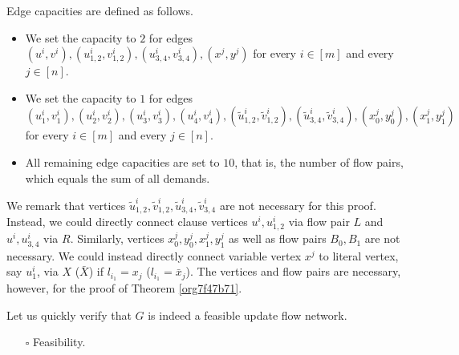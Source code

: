 \documentclass[fontsize=11pt,paper=a4]{book}
\begin{document}
Edge capacities are defined as follows.

\begin{itemize}
\item We set the capacity to \(2\) for edges \((u^i,v^i),(u_{1,2}^i,v_{1,2}^i),(u_{3,4}^i,v_{3,4}^i),(x^j,y^j)\) for every \(i\in[m]\) and every \(j\in[n]\).
\item We set the capacity to \(1\) for edges \((u_1^i,v_1^i),(u_2^i,v_2^i),(u_3^i,v_3^i),(u_4^i,v_4^i),(\tilde{u}_{1,2}^i,\tilde{v}_{1,2}^i),(\tilde{u}_{3,4}^i,\tilde{v}_{3,4}^i),(x_0^j,y_0^j),(x_1^j,y_1^j)\) for every \(i\in[m]\) and every \(j\in[n]\).
\item All remaining edge capacities are set to \(10\), that is, the number of flow pairs, which equals the sum of all demands.
\end{itemize}

We remark that vertices \(\tilde{u}_{1,2}^i,\tilde{v}_{1,2}^i,\tilde{u}_{3,4}^i,\tilde{v}_{3,4}^i\) are not necessary for this proof.
Instead, we could directly connect clause vertices \(u^i,u_{1,2}^i\) via flow pair \(L\) and \(u^i,u_{3,4}^i\) via \(R\). Similarly, vertices \(x_0^j,y_0^j,x_1^j,y_1^j\) as well as flow pairs \(B_0,B_1\) are not necessary.
We could instead directly connect variable vertex \(x^j\) to literal vertex, say \(u_1^i\), via \(X\) (\(\bar{X}\)) if \(l_{i_1}=x_j\) (\(l_{i_1}=\bar{x}_j\)).
The vertices and flow pairs are necessary, however, for the proof of Theorem \ref{org7f47b71}.

Let us quickly verify that \(G\) is indeed a feasible update flow network.

\begin{itemize}
\item[{$\square$}] Feasibility.
\end{itemize}
\end{document}
